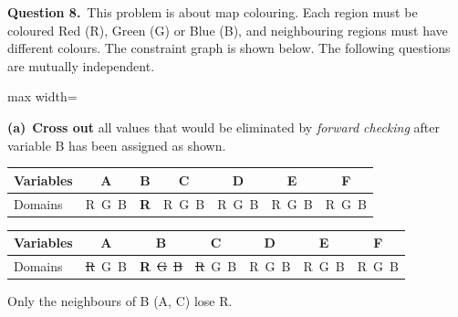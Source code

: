 \documentclass[11pt,a4paper]{article}
\newcommand{\question}[1]{\par\medskip\noindent\textbf{Question #1.}\ }
\newcommand{\subq}[1]{\par\smallskip\noindent\textbf{#1}\ }
\begin{document}
\question{8}This problem is about map colouring. Each region must be coloured Red (R), Green (G) or Blue (B), and neighbouring regions must have different colours. The constraint graph is shown below. The following questions are mutually independent.\begin{center}
\begin{adjustbox}{max width=\linewidth}
\end{adjustbox}
\end{center}
\subq{(a)}\textbf{Cross out} all values that would be eliminated by \emph{forward checking} after variable B has been assigned as shown.\begin{center}\small\begin{tabular}{|l|c|c|c|c|c|c|}\hline Variables & \textbf{A} & \textbf{B} & \textbf{C} & \textbf{D} & \textbf{E} & \textbf{F}\\ \hline Domains & R\ G\ B & \textbf{R} & R\ G\ B & R\ G\ B & R\ G\ B & R\ G\ B\\ \hline\end{tabular}\end{center}
\begin{solbox}
\begin{center}\small\begin{tabular}{|l|c|c|c|c|c|c|}\hline Variables & \textbf{A} & \textbf{B} & \textbf{C} & \textbf{D} & \textbf{E} & \textbf{F}\\ \hline Domains & \textcolor{red!70!black}{\sout{R}}\ G\ B & \textbf{R}\ \textcolor{red!70!black}{\sout{G}}\ \textcolor{red!70!black}{\sout{B}} & \textcolor{red!70!black}{\sout{R}}\ G\ B & R\ G\ B & R\ G\ B & R\ G\ B\\ \hline\end{tabular}\end{center}Only the neighbours of B (A, C) lose R.
\end{solbox}
\end{document}
